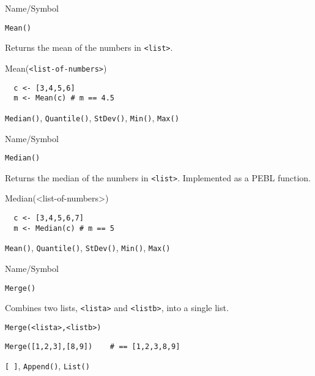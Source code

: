 \rl





\begin{desc}{Name/Symbol}
\item[Name/Symbol]	\verb+Mean()+

\item[Description] 	Returns the mean of the numbers in \verb+<list>+.

\item[Usage]	Mean(\verb+<list-of-numbers>+)	

\item[Example]	
\begin{verbatim} 
  c <- [3,4,5,6]
  m <- Mean(c) # m == 4.5
\end{verbatim}

\item[See Also]	\verb+Median()+, \verb+Quantile()+, \verb+StDev()+, \verb+Min()+, \verb+Max()+
\end{desc}

\rl



\begin{desc}{Name/Symbol}
\item[Name/Symbol]	\verb+Median()+

\item[Description]	Returns the median of the numbers in
  \verb+<list>+.  Implemented as a PEBL function.

\item[Usage]	Median(<list-of-numbers>)

\item[Example]	
  \begin{verbatim} 
  c <- [3,4,5,6,7]
  m <- Median(c) # m == 5
\end{verbatim}
\item[See Also]	\verb+Mean()+, \verb+Quantile()+, \verb+StDev()+, \verb+Min()+, \verb+Max()+
\end{desc}

\rl


\begin{desc}{Name/Symbol}
\item[Name/Symbol]	\verb+Merge()+

\item[Description]	Combines two lists, \verb+<lista>+ and \verb+<listb>+, into a single list.

\item[Usage]		
\begin{verbatim}
Merge(<lista>,<listb>)
\end{verbatim}

\item[Example]	
\begin{verbatim}
Merge([1,2,3],[8,9]) 	# == [1,2,3,8,9]
\end{verbatim}

\item[See Also]	\verb+[ ]+, \verb+Append()+, \verb+List()+
\end{desc}

